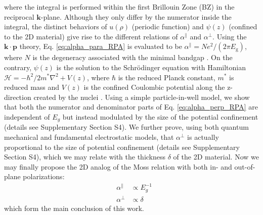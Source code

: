 \documentclass[journal=ancac3,manuscript=article,email=true,hyperref=true,keywords=false]{achemso}
\begin{document}
where the integral is performed within the first Brillouin Zone (BZ)
in the reciprocal $\mathbf{k}$-plane. Although they only differ by the
numerator inside the integral, the distinct behaviors of $u(\rho)$
(periodic function) and $\psi(z)$ (confined to the 2D material) give
rise to the different relations of $\alpha^{\parallel}$ and
$\alpha^{\perp}$. Using the $\mathbf{k} \cdot \mathbf{p}$ theory,
Eq. \ref{eq:alpha_para_RPA} is evaluated to be
$\alpha^{\parallel} = N e^{2}/(2\pi E_{\mathrm{g}})$, where $N$ is the
degeneracy associated with the minimal bandgap
\cite{Jiang_2017_Eg_Eb}. On the contrary, $\psi(z)$ is the solution to
the Schr\"{o}dinger equation with Hamiltonian
$\mathcal{H} = -\hbar^{2}/2m^{*} \nabla^{2} + V(z)$, where $\hbar$ is
the reduced Planck constant, $m^{*}$ is reduced mass and $V(z)$ is the
confined Coulombic potential along the z-direction created by the
nuclei \cite{davies_physics_1997,ihn_semiconductor_2009}. Using a
simple particle-in-well model, we show that both the numerator and
denominator parts of Eq. \ref{eq:alpha_perp_RPA} are independent of
$E_{g}$ but instead modulated by the size of the potential confinement
(details see Supplementary Section S4). We further prove,
using both quantum mechanical and fundamental electrostatic models,
that $\alpha^{\perp}$ is actually proportional to the size of
potential confinement (details see Supplementary Section
S4), which we may relate with the thickness $\delta$ of
the 2D material. Now we may finally propose the 2D analog of the Moss
relation with both in- and out-of-plane polarizations:
\begin{subequations}
\begin{eqnarray}
\label{eq:2D-Moss-para}
  &\alpha^{\parallel} &\propto E_{g}^{-1} \\
  \label{eq:2D-Moss-perp}
  &\alpha^{\perp} & \propto \delta
\end{eqnarray}
\end{subequations}
which form the main conclusion of this work.
\end{document}

